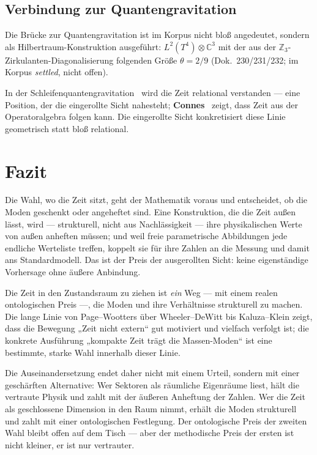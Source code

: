 \documentclass[11pt,a4paper]{article}
\begin{document}
\subsection{Verbindung zur Quantengravitation}

Die Brücke zur Quantengravitation ist im Korpus nicht bloß angedeutet, sondern als Hilbertraum-Konstruktion ausgeführt: $L^2(T^4)\otimes\mathbb{C}^3$ mit der aus der $\mathbb{Z}_3$-Zirkulanten-Diagonalisierung folgenden Größe $\theta = 2/9$ (Dok.~230/231/232; im Korpus \emph{settled}, nicht offen).

In der Schleifenquantengravitation~\cite{Rovelli2004,Thiemann2007} wird die Zeit relational verstanden --- eine Position, der die eingerollte Sicht nahesteht; \textbf{Connes}~\cite{Connes1994} zeigt, dass Zeit aus der Operatoralgebra folgen kann. Die eingerollte Sicht konkretisiert diese Linie geometrisch statt bloß relational.

\section{Fazit}

Die Wahl, wo die Zeit sitzt, geht der Mathematik voraus und entscheidet, ob die Moden geschenkt oder angeheftet sind. Eine Konstruktion, die die Zeit außen lässt, wird --- strukturell, nicht aus Nachlässigkeit --- ihre physikalischen Werte von außen anheften müssen; und weil freie parametrische Abbildungen jede endliche Werteliste treffen, koppelt sie für ihre Zahlen an die Messung und damit ans Standardmodell. Das ist der Preis der ausgerollten Sicht: keine eigenständige Vorhersage ohne äußere Anbindung.

Die Zeit in den Zustandsraum zu ziehen ist \emph{ein} Weg --- mit einem realen ontologischen Preis ---, die Moden und ihre Verhältnisse strukturell zu machen. Die lange Linie von Page--Wootters über Wheeler--DeWitt bis Kaluza--Klein zeigt, dass die Bewegung „Zeit nicht extern`` gut motiviert und vielfach verfolgt ist; die konkrete Ausführung „kompakte Zeit trägt die Massen-Moden`` ist eine bestimmte, starke Wahl innerhalb dieser Linie.

Die Auseinandersetzung endet daher nicht mit einem Urteil, sondern mit einer geschärften Alternative: Wer Sektoren als räumliche Eigenräume liest, hält die vertraute Physik und zahlt mit der äußeren Anheftung der Zahlen. Wer die Zeit als geschlossene Dimension in den Raum nimmt, erhält die Moden strukturell und zahlt mit einer ontologischen Festlegung. Der ontologische Preis der zweiten Wahl bleibt offen auf dem Tisch --- aber der methodische Preis der ersten ist nicht kleiner, er ist nur vertrauter.
\end{document}
